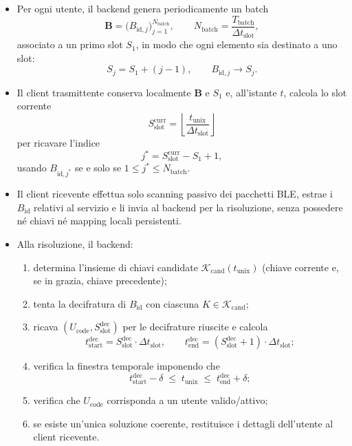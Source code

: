 \documentclass[a4paper,11pt]{article}
\begin{document}
\begin{itemize}
  \item Per ogni utente, il backend genera periodicamente un batch
        \[
          \mathbf{B} = \bigl(B_{\text{id},j}\bigr)_{j=1}^{N_{\text{batch}}},
          \qquad N_{\text{batch}} = \frac{T_{\text{batch}}}{\Delta t_{\text{slot}}},
        \]
        associato a un primo slot \(S_1\), in modo che ogni elemento sia destinato a uno slot:
        \[
          S_j = S_1 + (j-1), \qquad B_{\text{id},j} \longrightarrow S_j.
        \]

  \item Il client trasmittente conserva localmente \(\mathbf{B}\) e \(S_1\) e, all’istante \(t\),
        calcola lo slot corrente
        \[
          S_{\text{slot}}^{\text{curr}}
          = \left\lfloor \frac{t_{\text{unix}}}{\Delta t_{\text{slot}}} \right\rfloor
        \]
        per ricavare l’indice
        \[
          j^\ast = S_{\text{slot}}^{\text{curr}} - S_1 + 1,
        \]
        usando \(B_{\text{id},j^\ast}\) se e solo se \(1 \le j^\ast \le N_{\text{batch}}\).

  \item Il client ricevente effettua solo scanning passivo dei pacchetti BLE, estrae i
        \(B_{\text{id}}\) relativi al servizio e li invia al backend per la risoluzione, senza
        possedere né chiavi né mapping locali persistenti.

  \item Alla risoluzione, il backend:
        \begin{enumerate}[nosep]
          \item determina l’insieme di chiavi candidate
                \(\mathcal{K}_{\mathrm{cand}}(t_{\text{unix}})\) (chiave corrente e, se in grazia,
                chiave precedente);
          \item tenta la decifratura di \(B_{\text{id}}\) con ciascuna \(K \in \mathcal{K}_{\mathrm{cand}}\);
          \item ricava \((U_{\text{code}}, S_{\text{slot}}^{\text{dec}})\) per le decifrature riuscite e
                calcola
                \[
                  t_{\text{start}}^{\text{dec}}
                  = S_{\text{slot}}^{\text{dec}} \cdot \Delta t_{\text{slot}}, \qquad
                  t_{\text{end}}^{\text{dec}}
                  = (S_{\text{slot}}^{\text{dec}} + 1) \cdot \Delta t_{\text{slot}};
                \]
          \item verifica la finestra temporale imponendo che
                \[
                  t_{\text{start}}^{\text{dec}} - \delta
                  \;\le\;
                  t_{\text{unix}}
                  \;\le\;
                  t_{\text{end}}^{\text{dec}} + \delta;
                \]

          \item verifica che \(U_{\text{code}}\) corrisponda a un utente valido/attivo;
          \item se esiste un’unica soluzione coerente, restituisce i dettagli dell’utente al client
                ricevente.
        \end{enumerate}
\end{itemize}
\end{document}
